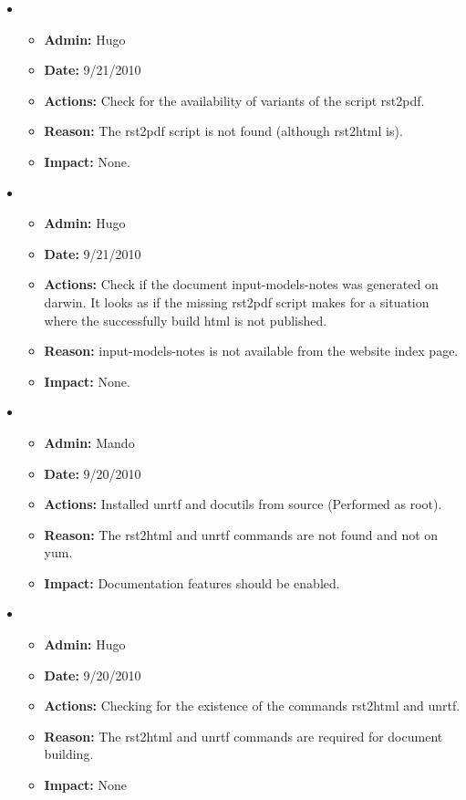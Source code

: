 \documentclass[12pt]{article}
\begin{document}
\begin{itemize}
\item 
\begin{itemize}
\item[] {\bf Admin:} Hugo
\item[] {\bf Date:} 9/21/2010 
\item[] {\bf Actions:} Check for the availability of variants of the
  script rst2pdf.
\item[] {\bf Reason:} The rst2pdf script is not found (although
  rst2html is).
\item[] {\bf Impact:} None.
\end{itemize}

\item 
\begin{itemize}
\item[] {\bf Admin:} Hugo
\item[] {\bf Date:} 9/21/2010 
\item[] {\bf Actions:} Check if the document input-models-notes was
  generated on darwin.  It looks as if the missing rst2pdf script
  makes for a situation where the successfully build html is not
  published.
\item[] {\bf Reason:} input-models-notes is not available from the
  website index page.
\item[] {\bf Impact:} None.
\end{itemize}

\item 
\begin{itemize}
\item[] {\bf Admin:} Mando
\item[] {\bf Date:} 9/20/2010 
\item[] {\bf Actions:} Installed unrtf and docutils from source (Performed as root).
\item[] {\bf Reason:} The rst2html and unrtf commands are not found and not on yum.
\item[] {\bf Impact:} Documentation features should be enabled.
\end{itemize}

\item 
\begin{itemize}
\item[] {\bf Admin:} Hugo
\item[] {\bf Date:} 9/20/2010 
\item[] {\bf Actions:} Checking for the existence of the commands
  rst2html and unrtf. 
\item[] {\bf Reason:} The rst2html and unrtf commands are required for
  document building.
\item[] {\bf Impact:} None
\end{itemize}
	

\end{itemize}
\end{document}
